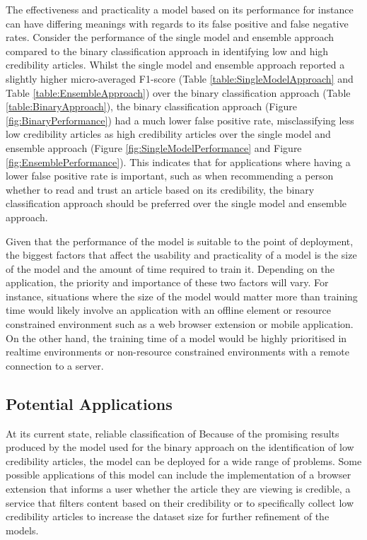\documentclass[a4paper,twoside,phd]{BYUPhys}
\begin{document}
The effectiveness and practicality a model based on its performance for instance can have differing meanings with regards to its false positive and false negative rates. Consider the performance of the single model and ensemble approach compared to the binary classification approach in identifying low and high credibility articles. Whilst the single model and ensemble approach reported a slightly higher micro-averaged F1-score (Table \ref{table:SingleModelApproach} and Table \ref{table:EnsembleApproach}) over the binary classification approach (Table \ref{table:BinaryApproach}), the binary classification approach (Figure \ref{fig:BinaryPerformance}) had a much lower false positive rate, misclassifying less low credibility articles as high credibility articles over the single model and ensemble approach (Figure \ref{fig:SingleModelPerformance} and Figure \ref{fig:EnsemblePerformance}). This indicates that for applications where having a lower false positive rate is important, such as when recommending a person whether to read and trust an article based on its credibility, the binary classification approach should be preferred over the single model and ensemble approach.\newline

Given that the performance of the model is suitable to the point of deployment, the biggest factors that affect the usability and practicality of a model is the size of the model and the amount of time required to train it. Depending on the application, the priority and importance of these two factors will vary. For instance, situations where the size of the model would matter more than training time would likely involve an application with an offline element or resource constrained environment such as a web browser extension or mobile application. On the other hand, the training time of a model would be highly prioritised in realtime environments or non-resource constrained environments with a remote connection to a server. \newline


\subsection{Potential Applications}
\label{sec:PotentialApplications}

At its current state, reliable classification of 
Because of the promising results produced by the model used for the binary approach on the identification of low credibility articles, the model can be deployed for a wide range of problems. Some possible applications of this model can include the implementation of a browser extension that informs a user whether the article they are viewing is credible, a service that filters content based on their credibility or to specifically collect low credibility articles to increase the dataset size for further refinement of the models.
\end{document}
